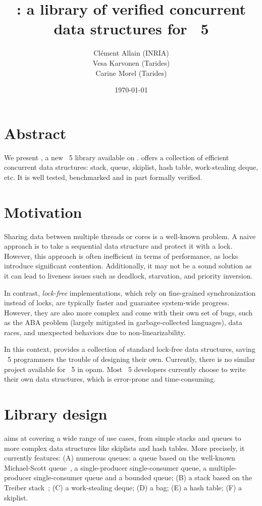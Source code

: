\documentclass[a4paper, 11pt]{article}
\title{\Saturn: a library of verified concurrent data structures for \OCaml~5}
\date{\today}
\author{
  Clément Allain (INRIA) \\
  Vesa Karvonen (Tarides) \\
  Carine Morel (Tarides)
}
\begin{document}
\maketitle

\section{Abstract}

We present \Saturn, a new \OCaml~5 library available on \opam.
\Saturn offers a collection of efficient concurrent data structures: stack, queue, skiplist, hash table, work-stealing deque, etc.
It is well tested, benchmarked and in part formally verified.

\section{Motivation}

Sharing data between multiple threads or cores is a well-known problem. A naive approach is to take a sequential data structure and protect it with a lock. However, this approach is often inefficient in terms of performance, as locks introduce significant contention. Additionally, it may not be a sound solution as it can lead to liveness issues such as deadlock, starvation, and priority inversion.

In contrast, \emph{lock-free} implementations, which rely on fine-grained synchronization instead of locks, are typically faster and guarantee system-wide progress. However, they are also more complex and come with their own set of bugs, such as the ABA problem (largely mitigated in garbage-collected languages), data races, and unexpected behaviors due to non-linearizability.

In this context, \Saturn provides a collection of standard lock-free data structures, saving \OCaml~5 programmers the trouble of designing their own. Currently, there is no similar project available for \OCaml~5 in opam. Most \OCaml~5 developers currently choose to write their own data structures, which is error-prone and time-consuming.

\section{Library design}

\Saturn aims at covering a wide range of use cases, from simple stacks and queues to more complex data structures like skiplists and hash tables.
More precisely, it currently features:
(A) numerous queues: a queue based on the well-known Michael-Scott queue~\cite{michael1996simple}, a single-producer single-consumer queue, a multiple-producer single-consumer queue and a bounded queue;
(B) a stack based on the Treiber stack~\cite{treiber1986systems};
(C) a work-stealing deque;
(D) a bag;
(E) a hash table;
(F) a skiplist.
\end{document}

